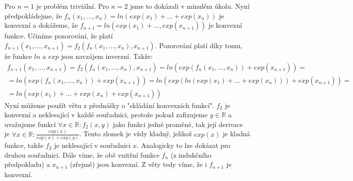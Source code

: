 \documentclass[12pt, a4paper]{article}
\begin{document}
\section{}
Pro $n=1$ je problém triviální. Pro $n=2$ jsme to dokázali v minulém úkolu. Nyní předpokládejme, že $f_n(x_1,\dots,x_n)=ln(exp(x_1)+\dots+exp(x_n))$ je konvexní a dokážeme, že $f_{n+1}=ln(exp(x_1)+\dots,exp(x_{n+1}))$ je konvexní funkce. Učiníme pozorování, že platí $f_{n+1}(x_1,\dots,x_{n+1})=f_2(f_n(x_1,\dots,x_n),x_{n+1})$. Pozorování platí díky tomu, že funkce $ln$ a $exp$ jsou navzájem inverzní. Takže:
\begin{gather*}
f_{n+1}(x_1,\dots,x_{n+1})=f_2(f_n(x_1,\dots,x_n),x_{n+1}) = ln(exp(f_n(x_1,\dots,x_n))+exp(x_{n+1}))=\\
=ln(exp(f_n(x_1,\dots,x_n))+exp(x_{n+1}))=ln(exp(ln(exp(x_1)+\dots+exp(x_n)))+exp(x_{n+1}))=\\
=ln(exp(x_1)+\dots+exp(x_n)+exp(x_{n+1}))
\end{gather*}
Nyní můžeme použít větu z přednášky o "skládání konvexních funkcí". $f_2$ je konvexní a neklesající v každé souřadnici, protože pokud zafixujeme $y \in \mathbb{R}$ a uvažujeme funkcí $\forall x\in \mathbb{R}: f_2(x,y)$ jako funkci jedné proměné, tak její derivace je $\forall x \in \mathbb{R}:\frac{exp(x)}{exp(x)+exp(y)}$. Tento zlomek je vždy kladný, jelikož $exp(x)$ je kladná funkce, takže $f_2$ je neklesající v souřadnici $x$. Analogicky to lze dokázat pro druhou souřadnici. Dále víme, že obě vnitřní funkce $f_n$ (z indukčního předpokladu) a $x_{n+1}$ (zřejmě) jsou konvexní. Z věty tedy víme, že i $f_{n+1}$ je konvexní.

\section{}
\end{document}
